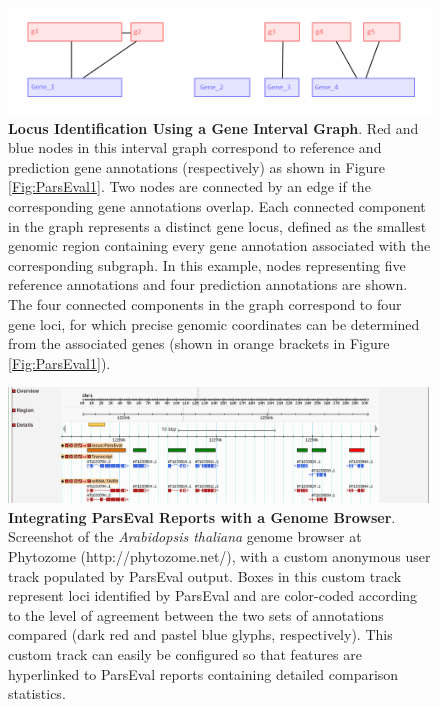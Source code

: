 \begin{figure}[h]
\includegraphics[width=6in]{Assets/Graphics/ParsEval/figure-2.png}
\caption{\textbf{Locus Identification Using a Gene Interval Graph}.
Red and blue nodes in this interval graph correspond to reference and prediction
gene annotations (respectively) as shown in Figure \ref{Fig:ParsEval1}. Two nodes are connected by an edge if the corresponding gene annotations overlap. Each
connected component in the graph represents a distinct
gene locus, defined as the smallest genomic region containing every gene annotation
associated with the corresponding subgraph. In this example, nodes representing five reference annotations and four prediction annotations are
shown. The four connected components in the graph correspond to four gene loci, for which precise genomic coordinates can be determined from
the associated genes (shown in orange brackets in Figure \ref{Fig:ParsEval1}).}
\label{Fig:ParsEval2}
\end{figure}

\begin{figure}[h]
\includegraphics[width=6in]{Assets/Graphics/ParsEval/figure-3.png}
\caption{\textbf{Integrating ParsEval Reports with a Genome Browser}.
Screenshot of the \textit{Arabidopsis thaliana} genome browser at Phytozome (http://phytozome.net/), with a custom anonymous user track populated by ParsEval output. Boxes in this custom track represent loci identified by ParsEval
and are color-coded according to the level of agreement between the two sets of annotations compared (dark red and pastel blue glyphs,
respectively). This custom track can easily be configured so that features are hyperlinked to ParsEval reports containing detailed comparison statistics.}
\label{Fig:ParsEval3}
\end{figure}
